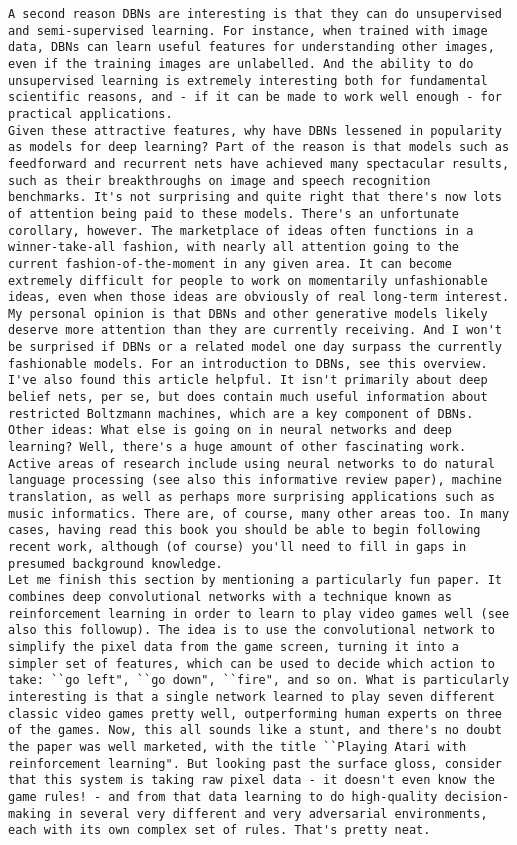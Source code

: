 \begin{lstlisting}
A second reason DBNs are interesting is that they can do unsupervised and semi-supervised learning. For instance, when trained with image data, DBNs can learn useful features for understanding other images, even if the training images are unlabelled. And the ability to do unsupervised learning is extremely interesting both for fundamental scientific reasons, and - if it can be made to work well enough - for practical applications.
Given these attractive features, why have DBNs lessened in popularity as models for deep learning? Part of the reason is that models such as feedforward and recurrent nets have achieved many spectacular results, such as their breakthroughs on image and speech recognition benchmarks. It's not surprising and quite right that there's now lots of attention being paid to these models. There's an unfortunate corollary, however. The marketplace of ideas often functions in a winner-take-all fashion, with nearly all attention going to the current fashion-of-the-moment in any given area. It can become extremely difficult for people to work on momentarily unfashionable ideas, even when those ideas are obviously of real long-term interest. My personal opinion is that DBNs and other generative models likely deserve more attention than they are currently receiving. And I won't be surprised if DBNs or a related model one day surpass the currently fashionable models. For an introduction to DBNs, see this overview. I've also found this article helpful. It isn't primarily about deep belief nets, per se, but does contain much useful information about restricted Boltzmann machines, which are a key component of DBNs.
Other ideas: What else is going on in neural networks and deep learning? Well, there's a huge amount of other fascinating work. Active areas of research include using neural networks to do natural language processing (see also this informative review paper), machine translation, as well as perhaps more surprising applications such as music informatics. There are, of course, many other areas too. In many cases, having read this book you should be able to begin following recent work, although (of course) you'll need to fill in gaps in presumed background knowledge.
Let me finish this section by mentioning a particularly fun paper. It combines deep convolutional networks with a technique known as reinforcement learning in order to learn to play video games well (see also this followup). The idea is to use the convolutional network to simplify the pixel data from the game screen, turning it into a simpler set of features, which can be used to decide which action to take: ``go left", ``go down", ``fire", and so on. What is particularly interesting is that a single network learned to play seven different classic video games pretty well, outperforming human experts on three of the games. Now, this all sounds like a stunt, and there's no doubt the paper was well marketed, with the title ``Playing Atari with reinforcement learning". But looking past the surface gloss, consider that this system is taking raw pixel data - it doesn't even know the game rules! - and from that data learning to do high-quality decision-making in several very different and very adversarial environments, each with its own complex set of rules. That's pretty neat.

\end{lstlisting}
